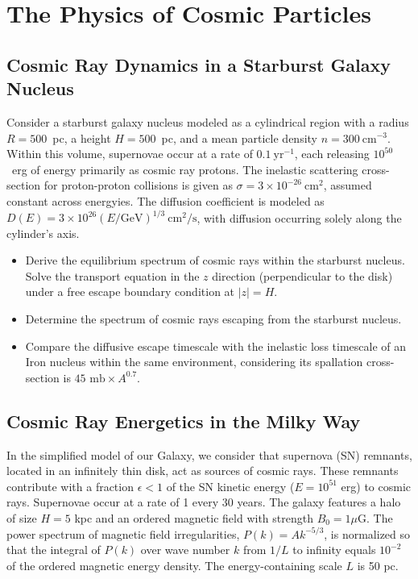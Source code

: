 \chapter{The Physics of Cosmic Particles}

\section{Cosmic Ray Dynamics in a Starburst Galaxy Nucleus}

Consider a starburst galaxy nucleus modeled as a cylindrical region with a radius \(R = 500\)~pc, a height \(H = 500\)~pc, and a mean particle density \(n = 300~\text{cm}^{-3}\). Within this volume, supernovae occur at a rate of \(0.1~\text{yr}^{-1}\), each releasing \(10^{50}\)~erg of energy primarily as cosmic ray protons. The inelastic scattering cross-section for proton-proton collisions is given as \(\sigma = 3 \times 10^{-26}~\text{cm}^2\), assumed constant across energyies. The diffusion coefficient is modeled as \(D(E) = 3 \times 10^{26} (E/\text{GeV})^{1/3}~\text{cm}^2/\text{s}\), with diffusion occurring solely along the cylinder's axis.

\begin{itemize}
\item Derive the equilibrium spectrum of cosmic rays within the starburst nucleus. Solve the transport equation in the \(z\) direction (perpendicular to the disk) under a free escape boundary condition at \(|z| = H\). 
\item Determine the spectrum of cosmic rays escaping from the starburst nucleus. 
\item Compare the diffusive escape timescale with the inelastic loss timescale of an Iron nucleus within the same environment, considering its spallation cross-section is \(45 \text{ mb} \times A^{0.7}\). 
\end{itemize}

\section{Cosmic Ray Energetics in the Milky Way}

In the simplified model of our Galaxy, we consider that supernova (SN) remnants, located in an infinitely thin disk, act as sources of cosmic rays. These remnants contribute with a fraction \( \epsilon < 1 \) of the SN kinetic energy (\(E = 10^{51}\) erg) to cosmic rays. Supernovae occur at a rate of 1 every 30 years. The galaxy features a halo of size \(H = 5\) kpc and an ordered magnetic field with strength \(B_0 = 1 \mu\)G. The power spectrum of magnetic field irregularities, \(P(k) = A k^{-5/3}\), is normalized so that the integral of \(P(k)\) over wave number \(k\) from \(1/L\) to infinity equals \(10^{-2}\) of the ordered magnetic energy density. The energy-containing scale \(L\) is 50 pc.

